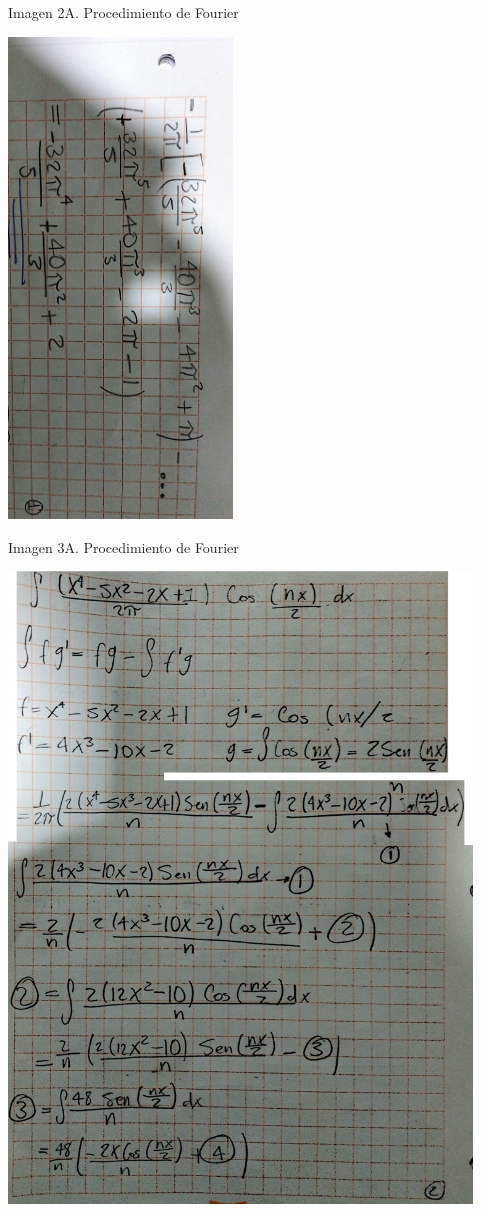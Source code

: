 Imagen 2A. Procedimiento de Fourier

\includegraphics[width=2.34606in,height=5.02604in]{media/image54.png}

Imagen 3A. Procedimiento de Fourier

\includegraphics[width=4.84817in,height=6.58854in]{media/image48.png}

